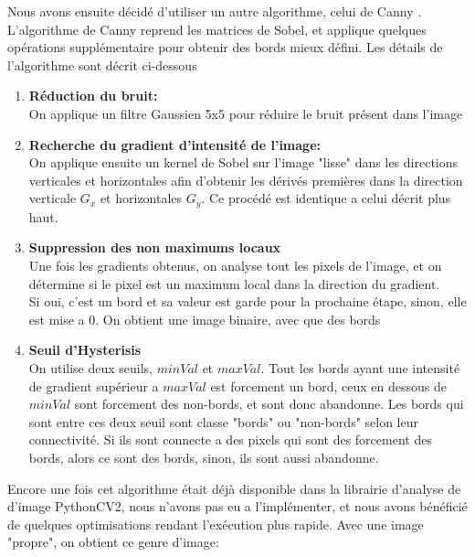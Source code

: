 \documentclass[a4paper, 12pt, titlepage, oneside, french]{article}
\begin{document}
	Nous avons ensuite décidé d'utiliser un autre algorithme, celui de Canny \cite{CannyOp}. L'algorithme de Canny reprend les matrices de Sobel, et applique quelques opérations supplémentaire pour obtenir des bords mieux défini. Les détails de l'algorithme sont décrit ci-dessous
	\begin{enumerate}
		\item \textbf{Réduction du bruit:}\\
			\indent On applique un filtre Gaussien 5x5 pour réduire le bruit présent dans l'image
		\item \textbf{Recherche du gradient d'intensité de l'image:}\\  
			\indent On applique ensuite un kernel de Sobel sur l'image "lisse" dans les directions verticales et horizontales afin d'obtenir les dérivés premières dans
			la direction verticale $G_x$ et horizontales $G_y$. Ce procédé est identique a celui décrit plus haut.

		\item \textbf{Suppression des non maximums locaux}\\
			\indent Une fois les gradients obtenus, on analyse tout les pixels de l'image, et on détermine si le pixel est un maximum local dans la
			direction du gradient. \\
			Si oui, c'est un bord et sa valeur est garde pour la prochaine étape, sinon, elle est mise a 0. On obtient une image binaire, avec que des bords

			\newpage

		\item \textbf{Seuil d'Hysterisis} \\
			\indent On utilise deux seuils, $minVal$ et $maxVal$. Tout les bords ayant une intensité de gradient supérieur a $maxVal$ est forcement un
			bord, ceux en dessous de $minVal$ sont forcement des non-bords, et sont donc abandonne. Les bords qui sont entre ces deux seuil sont classe
			"bords" ou "non-bords" selon leur connectivité. Si ils sont connecte a des pixels qui sont des forcement des bords, alors ce sont des bords,
			sinon, ils sont aussi abandonne.\\

	\end{enumerate}
	Encore une fois cet algorithme était déjà disponible dans la librairie d'analyse de d'image PythonCV2, nous n'avons pas eu a l'implémenter, et nous avons bénéficié de quelques optimisations rendant l'exécution plus rapide.
	Avec une image "propre", on obtient ce genre d'image:
\end{document}
